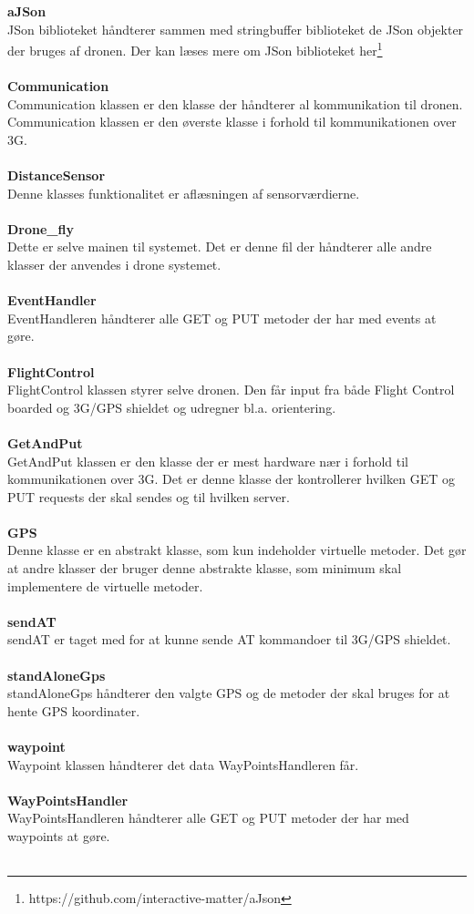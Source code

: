 \textbf{aJSon}\\
JSon biblioteket håndterer sammen med stringbuffer biblioteket de JSon objekter der bruges af dronen. Der kan læses mere om JSon biblioteket her\footnote{https://github.com/interactive-matter/aJson} \\ \\
\textbf{Communication}\\
Communication klassen er den klasse der håndterer al kommunikation til dronen. Communication klassen er den øverste klasse i forhold til kommunikationen over 3G. \\ \\
\textbf{DistanceSensor}\\
Denne klasses funktionalitet er aflæsningen af sensorværdierne. \\ \\
\textbf{Drone\_fly}\\
Dette er selve mainen til systemet. Det er denne fil der håndterer alle andre klasser der anvendes i drone systemet. \\ \\
\textbf{EventHandler}\\
EventHandleren håndterer alle GET og PUT metoder der har med events at gøre. \\ \\
\textbf{FlightControl}\\
FlightControl klassen styrer selve dronen. Den får input fra både Flight Control boarded og 3G/GPS shieldet og udregner bl.a. orientering. \\ \\
\textbf{GetAndPut}\\
GetAndPut klassen er den klasse der er mest hardware nær i forhold til kommunikationen over 3G. Det er denne klasse der kontrollerer hvilken GET og PUT requests der skal sendes og til hvilken server. \\ \\ 
\textbf{GPS}\\
Denne klasse er en abstrakt klasse, som kun indeholder virtuelle metoder. Det gør at andre klasser der bruger denne abstrakte klasse, som minimum skal implementere de virtuelle metoder. \\ \\
\textbf{sendAT}\\
sendAT er taget med for at kunne sende AT kommandoer til 3G/GPS shieldet. \\ \\
\textbf{standAloneGps}\\
standAloneGps håndterer den valgte GPS og de metoder der skal bruges for at hente GPS koordinater. \\ \\
\textbf{waypoint}\\
Waypoint klassen håndterer det data WayPointsHandleren får.\\ \\
\textbf{WayPointsHandler}\\
WayPointsHandleren håndterer alle GET og PUT metoder der har med  waypoints at gøre. \\ \\



